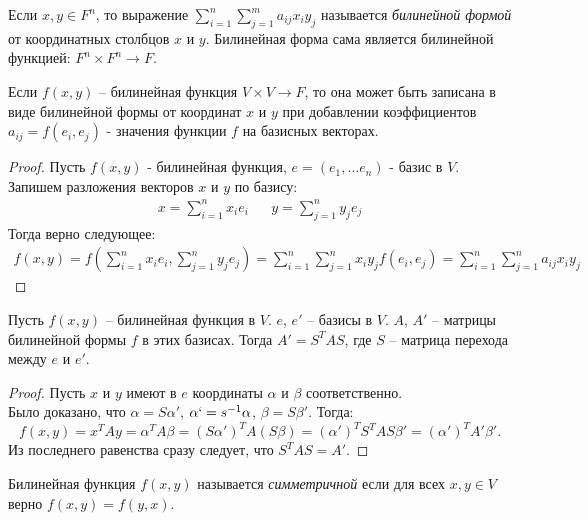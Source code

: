 \begin{definition}
    Если $x, y \in F^n$, то выражение $\displaystyle\sum_{i=1}^{n} \displaystyle\sum_{j=1}^{m} a_{ij} x_i y_j$ называется \textit{билинейной формой} от координатных столбцов $x$ и $y$. Билинейная форма сама является билинейной функцией: $F^n \times F^n \to F$.
\end{definition}

\begin{proposition}
    Если $f(x, y)$ -- билинейная функция $V \times V \to F$, то она может быть записана в виде билинейной формы от координат $x$ и $y$ при добавлении коэффициентов $a_{ij} = f(e_i, e_j)$ - значения функции $f$ на базисных векторах. 
\end{proposition}

\begin{proof}
    Пусть $f(x, y)$ - билинейная функция, $e = (e_1, \dots e_n)$ - базис в $V$. Запишем разложения векторов $x$ и $y$ по базису:
    \begin{align*}
        x = \sum_{i=1}^{n} x_i e_i && y = \sum_{j=1}^{n} y_j e_j
    \end{align*}
    Тогда верно следующее:
    \begin{gather*}
        f(x, y) = f(\sum_{i=1}^{n} x_i e_i, \sum_{j=1}^{n} y_j e_j) = \sum_{i=1}^{n} \sum_{j=1}^{n} x_i y_j f(e_i, e_j) = \sum_{i=1}^{n} \sum_{j=1}^{n} a_{ij} x_i y_j
    \end{gather*}
\end{proof}

\begin{proposition}
    Пусть $f(x, y)$ -- билинейная функция в $V$. $e$, $e'$ -- базисы в $V$. $A$, $A'$ -- матрицы билинейной формы $f$ в этих базисах. Тогда $A' = S^T A S$, где $S$ -- матрица перехода между $e$ и $e'$. 
\end{proposition}

\begin{proof}
    Пусть $x$ и $y$ имеют в $e$ координаты $\alpha$ и $\beta$ соответственно.\\ Было доказано, что $\alpha = S \alpha'$, $\alpha` = s^{-1} \alpha$, $\beta = S \beta'$. Тогда:
    $$f(x, y) = x^T A y = \alpha^T A \beta = (S \alpha')^T A (S \beta) = (\alpha')^T S^T A S \beta' = (\alpha')^T A' \beta'.$$ Из последнего равенства сразу следует, что $S^T A S = A'$.
\end{proof}

\begin{definition}
    Билинейная функция $f(x, y)$ называется \textit{симметричной} если для всех $x, y \in V$ верно 
    $f(x, y) = f(y, x)$.
\end{definition}


